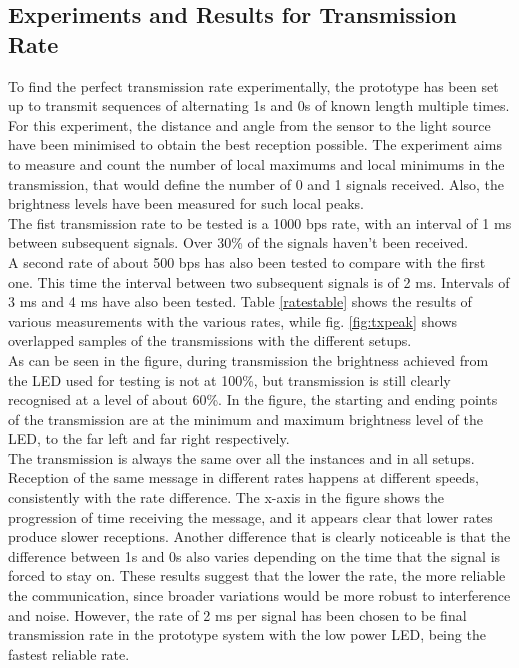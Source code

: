\subsection{Experiments and Results for Transmission Rate}
\label{tr:rate:exp}

To find the perfect transmission rate experimentally, the prototype has been set up to transmit sequences of alternating 1s and 0s of known length multiple times.
For this experiment, the distance and angle from the sensor to the light source have been minimised to obtain the best reception possible.
The experiment aims to measure and count the number of local maximums and local minimums in the transmission, that would define the number of 0 and 1 signals received.
Also, the brightness levels have been measured for such local peaks.\\
The fist transmission rate to be tested is a 1000 bps rate, with an interval of 1 ms between subsequent signals.
Over 30\% of the signals haven't been received.\\
A second rate of about 500 bps has also been tested to compare with the first one.
This time the interval between two subsequent signals is of 2 ms.
Intervals of 3 ms and 4 ms have also been tested.
Table \ref{ratestable} shows the results of various measurements with the various rates, while fig. \ref{fig:txpeak} shows overlapped samples of the transmissions with the different setups.\\
As can be seen in the figure, during transmission the brightness achieved from the LED used for testing is not at 100\%, but transmission is still clearly recognised at a level of about 60\%. 
In the figure, the starting and ending points of the transmission are at the minimum and maximum brightness level of the LED, to the far left and far right respectively.\\
The transmission is always the same over all the instances and in all setups.
Reception of the same message in different rates happens at different speeds, consistently with the rate difference.
The x-axis in the figure shows the progression of time receiving the message, and it appears clear that lower rates produce slower receptions.
Another difference that is clearly noticeable is that the difference between 1s and 0s also varies depending on the time that the signal is forced to stay on.
These results suggest that the lower the rate, the more reliable the communication, since broader variations would be more robust to interference and noise.
However, the rate of 2 ms per signal has been chosen to be final transmission rate in the prototype system with the low power LED, being the fastest reliable rate.
